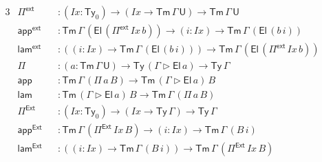 \documentclass[12pt,a4paper,twoside,openany]{book}
\theoremstyle{remark}
\theoremstyle{definition}
\theoremstyle{theorem}
\newcommand{\mi}[1]{\mathit{#1}}
\newcommand{\ms}[1]{\mathsf{#1}}
\newcommand{\Tm}{\mathsf{Tm}}
\newcommand{\Ty}{\mathsf{Ty}}
\newcommand{\U}{\mathsf{U}}
\newcommand{\El}{\mathsf{El}}
\newcommand{\ext}{\triangleright}
\newcommand{\Pie}{\Pi^{\mathsf{Ext}}}
\newcommand{\appe}{\mathsf{app^{Ext}}}
\newcommand{\lame}{\mathsf{lam^{Ext}}}
\newcommand{\Piinf}{\Pi^{\mathsf{ext}}}
\newcommand{\appinf}{\mathsf{app^{ext}}}
\newcommand{\laminf}{\mathsf{lam^{ext}}}
\newcommand{\app}{\ms{app}}
\newcommand{\lam}{\ms{lam}}
\begin{document}
\begin{alignat*}{3}
  &\Piinf &&: (\mi{Ix} : \Ty_0) \to (\mi{Ix} \to \Tm\,\Gamma\,\U) \to \Tm\,\Gamma\,\U\\
  &\appinf &&: \Tm\,\Gamma\,(\El\,(\Piinf\,\mi{Ix}\,b)) \to (i : \mi{Ix}) \to \Tm\,\Gamma\,(\El\,(b\,i))\\
  &\laminf &&: ((i : \mi{Ix}) \to \Tm\,\Gamma\,(\El\,(b\,i))) \to \Tm\,\Gamma\,(\El\,(\Piinf\,\mi{Ix}\,b))\\
  &\Pi &&: (a : \Tm\,\Gamma\,\U) \to \Ty\,(\Gamma\ext \El\,a) \to \Ty\,\Gamma\\
  &\app &&: \Tm\,\Gamma\,(\Pi\,a\,B) \to \Tm\,(\Gamma \ext \El\,a)\,B\\
  &\lam &&: \Tm\,(\Gamma \ext \El\,a)\,B \to \Tm\,\Gamma\,(\Pi\,a\,B)\\
  &\Pie &&: (\mi{Ix} : \Ty_0) \to (\mi{Ix} \to \Ty\,\Gamma) \to \Ty\,\Gamma\\
  &\appe &&: \Tm\,\Gamma\,(\Pie\,\mi{Ix}\,B) \to (i : \mi{Ix}) \to \Tm\,\Gamma\,(B\,i)\\
  &\lame &&: ((i : \mi{Ix}) \to \Tm\,\Gamma\,(B\,i)) \to \Tm\,\Gamma\,(\Pie\,\mi{Ix}\,B)
\end{alignat*}
\end{document}
